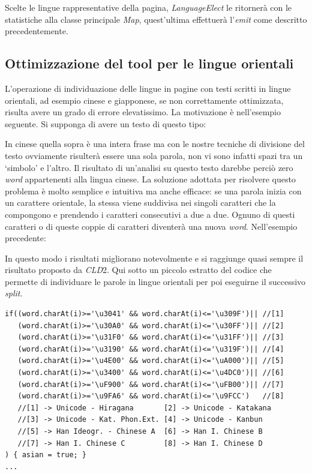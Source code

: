 \documentclass{article}
\newcommand{\cld}{\textit{CLD}2}
\newcommand{\class}[1]{\textit{#1}}
\begin{document}
Scelte le lingue rappresentative della pagina, \class{LanguageElect} le ritornerà con le statistiche alla classe principale \class{Map}, quest'ultima effettuerà l'\textit{emit} come descritto precedentemente. 

\subsection{Ottimizzazione del tool per le lingue orientali}

L'operazione di individuazione delle lingue in pagine con testi scritti in lingue orientali, ad esempio cinese e giapponese, se non correttamente ottimizzata, risulta avere un grado di errore elevatissimo. La motivazione è nell'esempio seguente. Si supponga di avere un testo di questo tipo:
\begin{center}
\imgchina
\end{center}
In cinese quella sopra è una intera frase ma con le nostre tecniche di divisione del testo ovviamente risulterà essere una sola parola, non vi sono infatti spazi tra un `simbolo' e l'altro. Il risultato di un'analisi su questo testo darebbe perciò zero \textit{word} appartenenti alla lingua cinese.
La soluzione adottata per risolvere questo problema è molto semplice e intuitiva ma anche efficace: se una parola inizia con un carattere orientale, la stessa viene suddivisa nei singoli caratteri che la compongono e prendendo i caratteri consecutivi a due a due. Ognuno di questi caratteri o di queste coppie di caratteri diventerà una nuova \textit{word}. Nell'esempio precedente:
\begin{center}
\imgchinasplitted
\end{center}
In questo modo i risultati migliorano notevolmente e si raggiunge quasi sempre il risultato proposto da \cld{}. Qui sotto un piccolo estratto del codice che permette di individuare le parole in lingue orientali per poi eseguirne il successivo \textit{split}.

\begin{verbatim}
if((word.charAt(i)>='\u3041' && word.charAt(i)<='\u309F')|| //[1]
   (word.charAt(i)>='\u30A0' && word.charAt(i)<='\u30FF')|| //[2] 
   (word.charAt(i)>='\u31F0' && word.charAt(i)<='\u31FF')|| //[3] 
   (word.charAt(i)>='\u3190' && word.charAt(i)<='\u319F')|| //[4]
   (word.charAt(i)>='\u4E00' && word.charAt(i)<='\uA000')|| //[5]
   (word.charAt(i)>='\u3400' && word.charAt(i)<='\u4DC0')|| //[6]
   (word.charAt(i)>='\uF900' && word.charAt(i)<='\uFB00')|| //[7]
   (word.charAt(i)>='\u9FA6' && word.charAt(i)<='\u9FCC')   //[8] 
   //[1] -> Unicode - Hiragana       [2] -> Unicode - Katakana
   //[3] -> Unicode - Kat. Phon.Ext. [4] -> Unicode - Kanbun
   //[5] -> Han Ideogr. - Chinese A  [6] -> Han I. Chinese B
   //[7] -> Han I. Chinese C         [8] -> Han I. Chinese D
) { asian = true; }
...
\end{verbatim}
\end{document}

